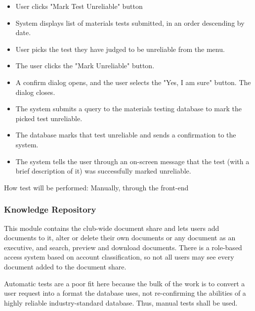 \documentclass[12pt, titlepage]{article}
\begin{document}
\begin{enumerate}
\begin{itemize}
  \item User clicks "Mark Test Unreliable" button
  \item System displays list of materials tests submitted, in an order descending by date.
  \item User picks the test they have judged to be unreliable from the menu.
  \item The user clicks the "Mark Unreliable" button. 
  \item A confirm dialog opens, and the user selects the "Yes, I am sure" button. The dialog closes.
  \item The system submits a query to the materials testing database to mark the picked test unreliable.
  \item The database marks that test unreliable and sends a confirmation to the system. 
  \item The system tells the user through an on-screen message that the test (with a brief description of it) was successfully marked unreliable.
\end{itemize}

How test will be performed: Manually, through the front-end
    
\end{enumerate}

\subsubsection{Knowledge Repository}

This module contains the club-wide document share and lets users add documents to it, alter or delete their own documents
or any document as an executive, and search, preview and download documents. There is a role-based access system based on
account classification, so not all users may see every document added to the document share.


Automatic tests are a poor fit here because the bulk of the work is to convert a user request into a format the 
database uses, not re-confirming the abilities of a highly reliable industry-standard database. Thus, manual
tests shall be used.
\end{document}
